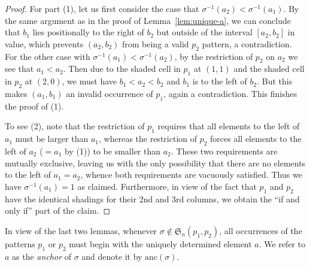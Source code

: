 \documentclass[12pt]{article}
\def\fS{\mathfrak{S}}
\def\anc{\mathrm{anc}}
\begin{document}
\begin{proof}
For part (1), let us first consider the case that $\sigma^{-1}(a_2) < \sigma^{-1}(a_1)$. By the same argument as in the proof of Lemma~\ref{lem:unique-a}, we can conclude that $b_1$ lies positionally to the right of $b_2$ but outside of the interval $[a_2,b_2]$ in value, which prevents $(a_2,b_2)$ from being a valid $p_2$ pattern, a contradiction. For the other case with $\sigma^{-1}(a_1) < \sigma^{-1}(a_2)$, by the restriction of $p_2$ on $a_2$ we see that $a_1<a_2$. Then due to the shaded cell in $p_1$ at $(1,1)$ and the shaded cell in $p_2$ at $(2,0)$, we must have $b_1<a_2<b_2$ and $b_1$ is to the left of $b_2$. But this makes $(a_1,b_1)$ an invalid occurrence of $p_1$, again a contradiction. This finishes the proof of (1).

To see (2), note that the restriction of $p_1$ requires that all elements to the left of $a_1$ must be larger than $a_1$, whereas the restriction of $p_2$ forces all elements to the left of $a_2$ ($=a_1$ by (1)) to be smaller than $a_2$. These two requirements are mutually exclusive, leaving us with the only possibility that there are no elements to the left of $a_1=a_2$, whence both requirements are vacuously satisfied. Thus we have $\sigma^{-1}(a_1)=1$ as claimed. Furthermore, in view of the fact that $p_1$ and $p_2$ have the identical shadings for their 2nd and 3rd columns, we obtain the ``if and only if'' part of the claim.
\end{proof}
In view of the last two lemmas, whenever $\sigma \notin \fS_n(p_1,p_2)$, all occurrences of the patterns $p_1$ or $p_2$ must begin with the uniquely determined element $a$. We refer to $a$ as the \emph{anchor} of $\sigma$ and denote it by $\anc(\sigma)$.
\end{document}
